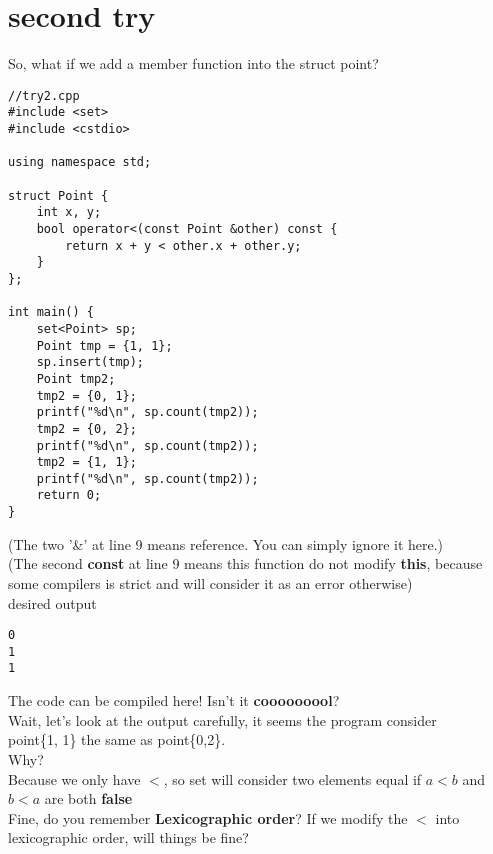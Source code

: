 \documentclass{article}
\begin{document}
\section{second try}
So, what if we add a member function into the struct point?
\begin{lstlisting}
//try2.cpp
#include <set>
#include <cstdio>

using namespace std;

struct Point {
    int x, y;
    bool operator<(const Point &other) const {
        return x + y < other.x + other.y;
    }
};

int main() {
    set<Point> sp;
    Point tmp = {1, 1};
    sp.insert(tmp);
    Point tmp2;
    tmp2 = {0, 1};
    printf("%d\n", sp.count(tmp2));
    tmp2 = {0, 2};
    printf("%d\n", sp.count(tmp2));
    tmp2 = {1, 1};
    printf("%d\n", sp.count(tmp2));
    return 0;
}
\end{lstlisting}
(The two '\&' at line 9 means reference. You can simply ignore it here.)\\
(The second \textbf{const} at line 9 means this function do not modify \textbf{this}, because some compilers is strict and will consider it as an error otherwise)\\
desired output
\begin{lstlisting}
0
1
1
\end{lstlisting}
The code can be compiled here! Isn't it \textbf{cooooooool}?\\
Wait, let's look at the output carefully, it seems the program consider\\
point\{1, 1\} the same as point\{0,2\}.\\
Why?\\
Because we only have $<$, so set will consider two elements equal if $a<b$ and $b<a$ are both \textbf{false}\\
Fine, do you remember \textbf{Lexicographic order}? If we modify the $<$ into lexicographic order, will things be fine?
\newpage
\end{document}
